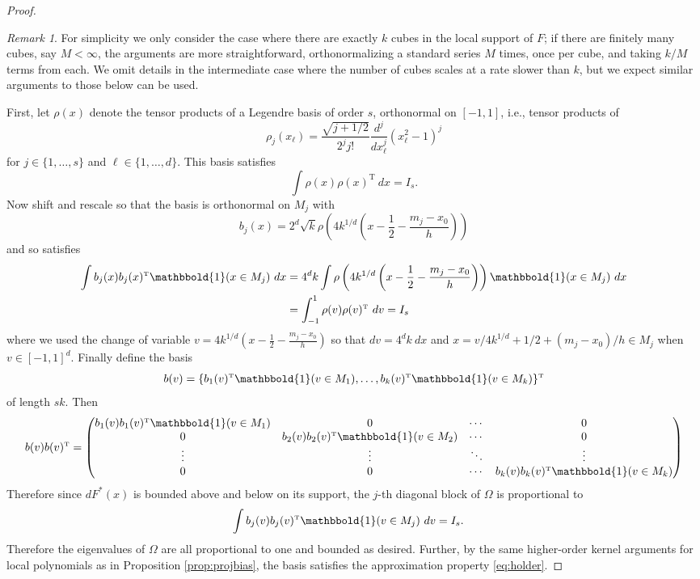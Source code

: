 \documentclass[11pt,twoside]{article}
\def\T{{ \mathrm{\scriptscriptstyle T} }}
\newcommand{\Holder}{\text{H\"{o}lder}}
\newcommand{\one}{\mathbbold{1}}
\theoremstyle{definition}
\theoremstyle{remark}
\newtheorem{remark}{Remark}
\begin{document}
\begin{proof}
\begin{remark}
For simplicity we only consider the case where there are exactly $k$ cubes in the local support of $F$; if there are finitely many cubes, say $M < \infty$, the arguments are more straightforward, orthonormalizing a standard series $M$ times, once per cube, and taking $k/M$ terms from each. We omit details in the intermediate case where the number of cubes scales at a rate slower than $k$, but we expect similar arguments to those below can be used. \\
\end{remark}

First, let $\rho(x)$ denote the tensor products of a Legendre basis of order $s$, orthonormal on $[-1,1]$, i.e.,  tensor products of
$$ \rho_j(x_\ell) = \frac{\sqrt{ j+1/2} }{2^j j!}  \frac{d^j}{dx_\ell^j} (x_\ell^2-1)^j  $$
for $j \in \{1,\dots,s\}$ and $\ell \in \{1,\dots,d\}$. This basis satisfies
$$ \int \rho(x) \rho(x)^\T \ dx = I_s . $$
Now shift and rescale so that the basis is orthonormal on $M_j$ with
$$ b_j(x) = 2^d \sqrt{ k} \rho\left(4k^{1/d} \left(x- \frac{1}{2} - \frac{m_j - x_0}{h} \right) \right) $$
and so satisfies
\begin{align*}
\int b_j(x) b_j(x)^\T \one(x \in M_j) \ dx &=4^d k \int \rho\left(4k^{1/d} \left(x- \frac{1}{2} - \frac{m_j - x_0}{h} \right) \right) \one(x \in M_j) \ dx \\
&= \int_{-1}^1 \rho(v) \rho(v)^\T \ dv = I_s
\end{align*}
where we used the change of variable $v = 4k^{1/d} \left(x- \frac{1}{2} - \frac{m_j - x_0}{h} \right)$ so that $dv = 4^d k \ dx$ and $x = v/4k^{1/d} + 1/2 + (m_j-x_0)/h \in M_j$ when $v \in [-1,1]^d$.  Finally define the basis 
$$ b(v) = \{ b_1(v)^\T \one(v \in M_1), \dots, b_k(v)^\T \one(v \in M_k) \}^\T  $$
of length $sk$. Then
\begin{align*}
b(v) b(v)^\T = 
\begin{pmatrix} 
b_1(v) b_1(v)^\T \one(v \in M_1) & 0 & \cdots & 0 \\
0 & b_2(v) b_2(v)^\T \one(v \in M_2) & \cdots & 0 \\
\vdots & \vdots & \ddots & \vdots \\
0 & 0 & \cdots & b_k(v) b_k(v)^\T \one(v \in M_k) \\
\end{pmatrix}
\end{align*}
Therefore since $dF^*(x)$ is bounded above and below on its support, the $j$-th diagonal block of $\Omega$ is proportional to
\begin{align*}
\int   b_j(v) b_j(v)^\T \one(v \in M_j) \ dv&= I_s .
\end{align*}
Therefore the eigenvalues of $\Omega$ are all proportional to one and bounded as desired. Further, by  the same higher-order kernel arguments for local polynomials as in Proposition \ref{prop:projbias}, the basis satisfies the  \Holder{} approximation property \eqref{eq:holder}. 
\end{proof}


\end{document}
